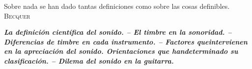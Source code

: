 \documentclass[
11pt, %
a4paper, %
oneside, %
headinclude,footinclude, %
BCOR5mm, %
]{scrartcl}
\begin{document}

\par{Sobre nada se han dado tantas definiciones como sobre las cosas definibles.} \newline
 \textsc{Becquer}
\newline
\par \textbf{\textit{La definición científica del sonido. -- El timbre en la sonoridad. -- Diferencias de timbre en cada instrumento. -- Factores queintervienen en la apreciación del sonido. Orientaciones que handeterminado su clasificación. -- Dilema del sonido en la guitarra.}}
\newline
\end{document}
